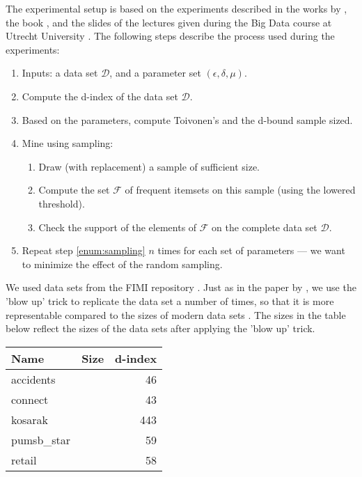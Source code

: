 \documentclass[../main.tex]{subfiles}
\begin{document}
The experimental setup is based on the experiments described in the works by \citeauthor{Riondato2015} \cite{Riondato2015},
the book  \cite{Leskovec2014mining},
and the slides of the lectures given during the Big Data course at Utrecht University \cite{Siebes2017fim}.
The following steps describe the process used during the experiments:
\begin{enumerate}[noitemsep]
    \item Inputs: a data set $\mathcal{D}$, and a parameter set $(\epsilon, \delta, \mu)$.
    \item Compute the d-index of the data set $\mathcal{D}$.
    \item Based on the parameters, compute Toivonen's and the d-bound sample sized.
    \item \label{enum:sampling} Mine using sampling:
        \begin{enumerate}[noitemsep]
            \item Draw (with replacement) a sample of sufficient size.
            \item Compute the set $\mathcal{F}$ of frequent itemsets on this sample (using the lowered threshold).
            \item Check the support of the elements of $\mathcal{F}$ on the complete data set $\mathcal{D}$.
        \end{enumerate}
    \item Repeat step \ref{enum:sampling} $n$ times for each set of parameters --- we want to minimize the effect of the random sampling.
\end{enumerate}

We used data sets from the FIMI repository \cite{FIMI2003}.
Just as in the paper by \citeauthor{Riondato2015}, we use the 'blow up' trick to replicate the data set a number of times,
so that it is more representable compared to the sizes of modern data sets \cite[Section~5]{Riondato2015}.
The sizes in the table below reflect the sizes of the data sets after applying the 'blow up' trick.

\begin{center}
\begin{tabular}{l r r}
    \hline
    Name & Size & d-index \\
    \hline
    accidents & & 46 \\
    connect & & 43 \\
    kosarak & & 443 \\
    pumsb\_star & & 59 \\
    retail & & 58 \\
    \hline
\end{tabular}
\end{center}
\end{document}
